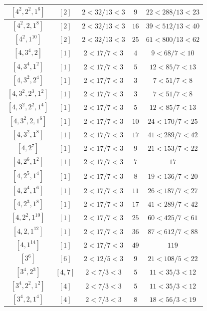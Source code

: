 \documentclass{article}%
\begin{document}
\begin{center}
\begin{longtable}{||c|c|c|c|c||}
$[4^{2}, 2^{2}, 1^{6}]$ & $[2]$ & $2 < 32/13 < 3$ & $9$ & $22 < 288/13 < 23$ \\ \hline 
$[4^{2}, 2, 1^{8}]$ & $[2]$ & $2 < 32/13 < 3$ & $16$ & $39 < 512/13 < 40$ \\ \hline 
$[4^{2}, 1^{10}]$ & $[2]$ & $2 < 32/13 < 3$ & $25$ & $61 < 800/13 < 62$ \\ \hline 
$[4, 3^{4}, 2]$ & $[1]$ & $2 < 17/7 < 3$ & $4$ & $9 < 68/7 < 10$ \\ \hline 
$[4, 3^{4}, 1^{2}]$ & $[1]$ & $2 < 17/7 < 3$ & $5$ & $12 < 85/7 < 13$ \\ \hline 
$[4, 3^{2}, 2^{4}]$ & $[1]$ & $2 < 17/7 < 3$ & $3$ & $7 < 51/7 < 8$ \\ \hline 
$[4, 3^{2}, 2^{3}, 1^{2}]$ & $[1]$ & $2 < 17/7 < 3$ & $3$ & $7 < 51/7 < 8$ \\ \hline 
$[4, 3^{2}, 2^{2}, 1^{4}]$ & $[1]$ & $2 < 17/7 < 3$ & $5$ & $12 < 85/7 < 13$ \\ \hline 
$[4, 3^{2}, 2, 1^{6}]$ & $[1]$ & $2 < 17/7 < 3$ & $10$ & $24 < 170/7 < 25$ \\ \hline 
$[4, 3^{2}, 1^{8}]$ & $[1]$ & $2 < 17/7 < 3$ & $17$ & $41 < 289/7 < 42$ \\ \hline 
$[4, 2^{7}]$ & $[1]$ & $2 < 17/7 < 3$ & $9$ & $21 < 153/7 < 22$ \\ \hline 
$[4, 2^{6}, 1^{2}]$ & $[1]$ & $2 < 17/7 < 3$ & $7$ & $17$ \\ \hline 
$[4, 2^{5}, 1^{4}]$ & $[1]$ & $2 < 17/7 < 3$ & $8$ & $19 < 136/7 < 20$ \\ \hline 
$[4, 2^{4}, 1^{6}]$ & $[1]$ & $2 < 17/7 < 3$ & $11$ & $26 < 187/7 < 27$ \\ \hline 
$[4, 2^{3}, 1^{8}]$ & $[1]$ & $2 < 17/7 < 3$ & $17$ & $41 < 289/7 < 42$ \\ \hline 
$[4, 2^{2}, 1^{10}]$ & $[1]$ & $2 < 17/7 < 3$ & $25$ & $60 < 425/7 < 61$ \\ \hline 
$[4, 2, 1^{12}]$ & $[1]$ & $2 < 17/7 < 3$ & $36$ & $87 < 612/7 < 88$ \\ \hline 
$[4, 1^{14}]$ & $[1]$ & $2 < 17/7 < 3$ & $49$ & $119$ \\ \hline 
$[3^{6}]$ & $[6]$ & $2 < 12/5 < 3$ & $9$ & $21 < 108/5 < 22$ \\ \hline 
$[3^{4}, 2^{3}]$ & $[4, 7]$ & $2 < 7/3 < 3$ & $5$ & $11 < 35/3 < 12$ \\ \hline 
$[3^{4}, 2^{2}, 1^{2}]$ & $[4]$ & $2 < 7/3 < 3$ & $5$ & $11 < 35/3 < 12$ \\ \hline 
$[3^{4}, 2, 1^{4}]$ & $[4]$ & $2 < 7/3 < 3$ & $8$ & $18 < 56/3 < 19$ \\ \hline 

\end{longtable}
\end{center}
\end{document}
